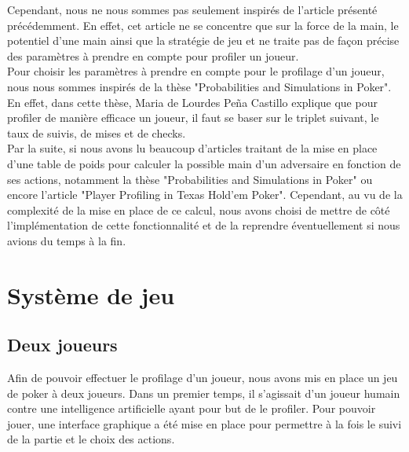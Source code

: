 \documentclass{report}
\begin{document}
Cependant, nous ne nous sommes pas seulement inspirés de l'article présenté précédemment. En effet, cet article ne se concentre que sur la force de la main, le potentiel d'une main ainsi que la stratégie de jeu et ne traite pas de façon précise des paramètres à prendre en compte pour profiler un joueur. \\

Pour choisir les paramètres à prendre en compte pour le profilage d'un joueur, nous nous sommes inspirés de la thèse "Probabilities and Simulations in Poker". En effet, dans cette thèse, Maria de Lourdes Peña Castillo explique que pour profiler de manière efficace un joueur, il faut se baser sur le triplet suivant, le taux de suivis, de mises et de checks. \\

Par la suite, si nous avons lu beaucoup d'articles traitant de la mise en place d'une table de poids pour calculer la possible main d'un adversaire en fonction de ses actions, notamment la thèse "Probabilities and Simulations in Poker" ou encore l'article "Player Profiling in Texas Hold'em Poker". Cependant, au vu de la complexité de la mise en place de ce calcul, nous avons choisi de mettre de côté l'implémentation de cette fonctionnalité et de la reprendre éventuellement si nous avions du temps à la fin. \\




%
%
%
%
%
%
%
%

\section{Système de jeu}

\subsection{Deux joueurs}
\hspace{0.5cm}Afin de pouvoir effectuer le profilage d'un joueur, nous avons mis en place un jeu de poker à deux joueurs. Dans un premier temps, il s'agissait d'un joueur humain contre une intelligence artificielle ayant pour but de le profiler. Pour pouvoir jouer, une interface graphique a été mise en place pour permettre à la fois le suivi de la partie et le choix des actions.\\
\end{document}
